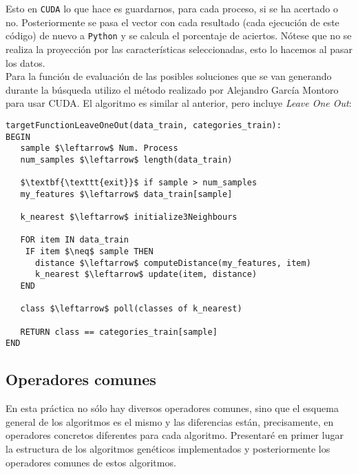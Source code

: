 \documentclass[11pt,leqno]{article}
\begin{document}
	Esto en \texttt{CUDA} lo que hace es guardarnos, para cada proceso, si se ha acertado o no. Posteriormente se pasa el vector con cada resultado (cada ejecución de este código) de nuevo a \texttt{Python} y se calcula el porcentaje de aciertos. Nótese que no se realiza la proyección por las características seleccionadas, esto lo hacemos al pasar los datos.\\
	Para la función de evaluación de las posibles soluciones que se van generando durante la búsqueda utilizo el método realizado por Alejandro García Montoro para usar CUDA. El algoritmo es similar al anterior, pero incluye \textit{Leave One Out}:

\begin{lstlisting}[mathescape=true]
targetFunctionLeaveOneOut(data_train, categories_train):
BEGIN
   sample $\leftarrow$ Num. Process
   num_samples $\leftarrow$ length(data_train)
   
   $\textbf{\texttt{exit}}$ if sample > num_samples
   my_features $\leftarrow$ data_train[sample]
   
   k_nearest $\leftarrow$ initialize3Neighbours
	
   FOR item IN data_train
    IF item $\neq$ sample THEN
      distance $\leftarrow$ computeDistance(my_features, item)
      k_nearest $\leftarrow$ update(item, distance)
   END
	
   class $\leftarrow$ poll(classes of k_nearest)
      
   RETURN class == categories_train[sample]
END
\end{lstlisting}

\subsection{Operadores comunes}
	
	En esta práctica no sólo hay diversos operadores comunes, sino que el esquema general de los algoritmos es el mismo y las diferencias están, precisamente, en operadores concretos diferentes para cada algoritmo. Presentaré en primer lugar la estructura de los algoritmos genéticos implementados y posteriormente los operadores comunes de estos algoritmos.
	
\end{document}
